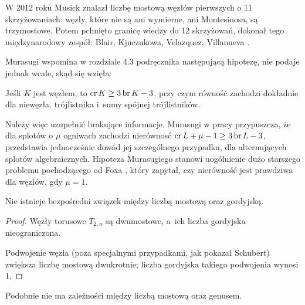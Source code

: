 W 2012 roku Musick \cite{musick12} znalazł liczbę mostową węzłów pierwszych o 11 skrzyżowaniach: węzły, które nie są ani wymierne, ani Montesinosa, są trzymostowe.
%
Potem pchnięto granicę wiedzy do 12 skrzyżowań, dokonał tego międzynarodowy zespół: Blair, Kjuczukowa, Velazquez, Villanueva \cite{blair20}.
%
%
%
%

Murasugi wspomina w rozdziale 4.3 podręcznika \cite{murasugi96} następującą hipotezę, nie podaje jednak wcale, skąd się wzięła:
%

\begin{conjecture}
%
    Jeśli $K$ jest węzłem, to $\operatorname{cr} K \ge 3 \operatorname{br} K - 3$, przy czym równość zachodzi dokładnie dla niewęzła, trójlistnika i~sumy spójnej trójlistników.
\end{conjecture}

Należy więc uzupełnić brakujące informacje.
Murasugi w pracy \cite{murasugi88} przypuszcza, że dla splotów o $\mu$ ogniwach zachodzi nierównosć $\operatorname{cr} L + \mu - 1 \ge 3 \operatorname{br} L - 3$, przedstawia jednocześnie dowód jej szczególnego przypadku, dla alternujących splotów algebraicznych.
%
Hipoteza Murasugiego stanowi uogólnienie dużo starszego problemu pochodzącego od Foxa \cite{fox50}, który zapytał, czy nierówność jest prawdziwa dla węzłów, gdy $\mu = 1$.
%

\begin{proposition}
%
\label{no_relation_bridge_unknotting}%
    Nie istnieje bezpośredni związek między liczbą mostową oraz gordyjską.
\end{proposition}

\begin{proof}
    Węzły torusowe $T_{2,n}$ są dwumostowe, a~ich liczba gordyjska nieograniczona.

    Podwojenie węzła (poza specjalnymi przypadkami, jak pokazał Schubert) zwiększa liczbę mostową dwukrotnie; liczba gordyjska takiego podwojenia wynosi $1$.
\end{proof}

Podobnie nie ma zależności między liczbą mostową oraz genusem.
%

%


